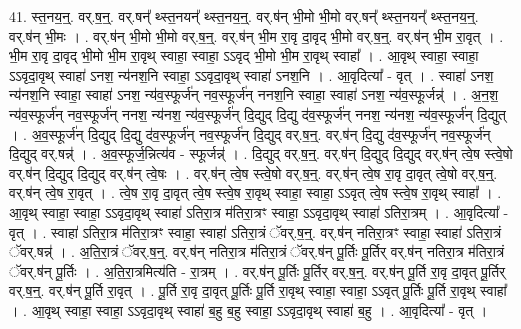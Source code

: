 \documentclass[17pt]{extarticle}
\begin{document}
41. स्त॒नय॒न्॒. वर्.ष॒न्॒. वर्.षन्᳚ थ्स्त॒नयन्᳚ थ्स्त॒नय॒न्॒. वर्.ष॑न् भी॒मो भी॒मो वर्.षन्᳚ थ्स्त॒नयन्᳚ थ्स्त॒नय॒न्॒. वर्.ष॑न् भी॒मः । . वर्.ष॑न् भी॒मो भी॒मो वर्.ष॒न्॒. वर्.ष॑न् भी॒म रा॒वृ दा॒वृद् भी॒मो वर्.ष॒न्॒. वर्.ष॑न् भी॒म रा॒वृत् । . भी॒म रा॒वृ दा॒वृद् भी॒मो भी॒म रा॒वृथ् स्वाहा॒ स्वाहा॒ ऽऽवृद् भी॒मो भी॒म रा॒वृथ् स्वाहा᳚ । . आ॒वृथ् स्वाहा॒ स्वाहा॒ ऽऽवृदा॒वृथ् स्वाहा॑ ऽनश॒ न्य॑नश॒नि स्वाहा॒ ऽऽवृदा॒वृथ् स्वाहा॑ ऽनश॒नि । . आ॒वृदित्या᳚ - वृत् । . स्वाहा॑ ऽनश॒ न्य॑नश॒नि स्वाहा॒ स्वाहा॑ ऽनश॒ न्य॑व॒स्फूर्ज॑न् नव॒स्फूर्ज॑न् ननश॒नि स्वाहा॒ स्वाहा॑ ऽनश॒ न्य॑व॒स्फूर्जन्न्॑ । . अ॒न॒श॒ न्य॑व॒स्फूर्ज॑न् नव॒स्फूर्ज॑न् ननश॒ न्य॑नश॒ न्य॑व॒स्फूर्ज॑न् दि॒द्युद् दि॒द्यु द॑व॒स्फूर्ज॑न् ननश॒ न्य॑नश॒ न्य॑व॒स्फूर्ज॑न् दि॒द्युत् । . अ॒व॒स्फूर्ज॑न् दि॒द्युद् दि॒द्यु द॑व॒स्फूर्ज॑न् नव॒स्फूर्ज॑न् दि॒द्युद् वर्.ष॒न्॒. वर्.ष॑न् दि॒द्यु द॑व॒स्फूर्ज॑न् नव॒स्फूर्ज॑न् दि॒द्युद् वर्.षन्न्॑ । . अ॒व॒स्फूर्ज॒न्नित्य॑व - स्फूर्जन्न्॑ । . दि॒द्युद् वर्.ष॒न्॒. वर्.ष॑न् दि॒द्युद् दि॒द्युद् वर्.ष॑न् त्वे॒ष स्त्वे॒षो वर्.ष॑न् दि॒द्युद् दि॒द्युद् वर्.ष॑न् त्वे॒षः । . वर्.ष॑न् त्वे॒ष स्त्वे॒षो वर्.ष॒न्॒. वर्.ष॑न् त्वे॒ष रा॒वृ दा॒वृत् त्वे॒षो वर्.ष॒न्॒. वर्.ष॑न् त्वे॒ष रा॒वृत् । . त्वे॒ष रा॒वृ दा॒वृत् त्वे॒ष स्त्वे॒ष रा॒वृथ् स्वाहा॒ स्वाहा॒ ऽऽवृत् त्वे॒ष स्त्वे॒ष रा॒वृथ् स्वाहा᳚ । . आ॒वृथ् स्वाहा॒ स्वाहा॒ ऽऽवृदा॒वृथ् स्वाहा॑ ऽतिरा॒त्र म॑तिरा॒त्रꣳ स्वाहा॒ ऽऽवृदा॒वृथ् स्वाहा॑ ऽतिरा॒त्रम् । . आ॒वृदित्या᳚ - वृत् । . स्वाहा॑ ऽतिरा॒त्र म॑तिरा॒त्रꣳ स्वाहा॒ स्वाहा॑ ऽतिरा॒त्रं ॅवर्.ष॒न्॒. वर्.ष॑न् नतिरा॒त्रꣳ स्वाहा॒ स्वाहा॑ ऽतिरा॒त्रं ॅवर्.षन्न्॑ । . अ॒ति॒रा॒त्रं ॅवर्.ष॒न्॒. वर्.ष॑न् नतिरा॒त्र म॑तिरा॒त्रं ॅवर्.ष॑न् पू॒र्तिः पू॒र्तिर् वर्.ष॑न् नतिरा॒त्र म॑तिरा॒त्रं ॅवर्.ष॑न् पू॒र्तिः । . अ॒ति॒रा॒त्रमित्य॑ति - रा॒त्रम् । . वर्.ष॑न् पू॒र्तिः पू॒र्तिर् वर्.ष॒न्॒. वर्.ष॑न् पू॒र्ति रा॒वृ दा॒वृत् पू॒र्तिर् वर्.ष॒न्॒. वर्.ष॑न् पू॒र्ति रा॒वृत् । . पू॒र्ति रा॒वृ दा॒वृत् पू॒र्तिः पू॒र्ति रा॒वृथ् स्वाहा॒ स्वाहा॒ ऽऽवृत् पू॒र्तिः पू॒र्ति रा॒वृथ् स्वाहा᳚ । . आ॒वृथ् स्वाहा॒ स्वाहा॒ ऽऽवृदा॒वृथ् स्वाहा॑ ब॒हु ब॒हु स्वाहा॒ ऽऽवृदा॒वृथ् स्वाहा॑ ब॒हु । . आ॒वृदित्या᳚ - वृत् । \newline
\pagebreak
{}
\end{document}
